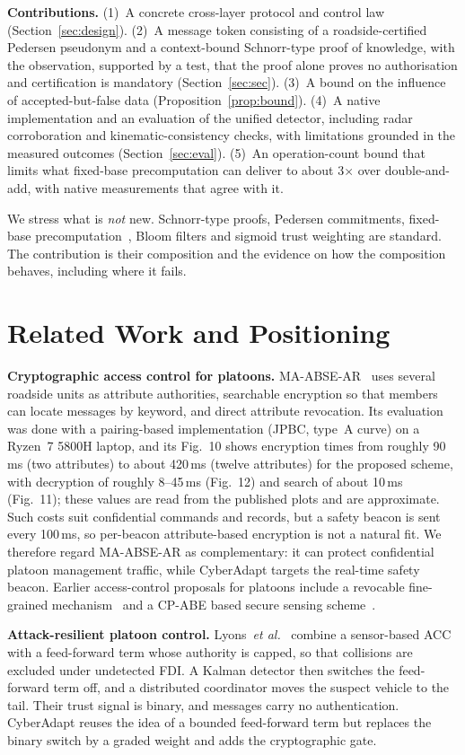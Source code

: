 \documentclass[journal]{IEEEtran}
\begin{document}
\textbf{Contributions.} (1)~A concrete cross-layer protocol and control law (Section~\ref{sec:design}). (2)~A message token consisting of a roadside-certified Pedersen pseudonym and a context-bound Schnorr-type proof of knowledge, with the observation, supported by a test, that the proof alone proves no authorisation and certification is mandatory (Section~\ref{sec:sec}). (3)~A bound on the influence of accepted-but-false data (Proposition~\ref{prop:bound}). (4)~A native implementation and an evaluation of the unified detector, including radar corroboration and kinematic-consistency checks, with limitations grounded in the measured outcomes (Section~\ref{sec:eval}). (5)~An operation-count bound that limits what fixed-base precomputation can deliver to about 3$\times$ over double-and-add, with native measurements that agree with it.

We stress what is \emph{not} new. Schnorr-type proofs, Pedersen commitments, fixed-base precomputation~\cite{bgmw1992}, Bloom filters and sigmoid trust weighting are standard. The contribution is their composition and the evidence on how the composition behaves, including where it fails.

\section{Related Work and Positioning}
\textbf{Cryptographic access control for platoons.} MA-ABSE-AR~\cite{chen2026} uses several roadside units as attribute authorities, searchable encryption so that members can locate messages by keyword, and direct attribute revocation. Its evaluation was done with a pairing-based implementation (JPBC, type~A curve) on a Ryzen~7 5800H laptop, and its Fig.~10 shows encryption times from roughly 90\,ms (two attributes) to about 420\,ms (twelve attributes) for the proposed scheme, with decryption of roughly 8--45\,ms (Fig.~12) and search of about 10\,ms (Fig.~11); these values are read from the published plots and are approximate. Such costs suit confidential commands and records, but a safety beacon is sent every 100\,ms, so per-beacon attribute-based encryption is not a natural fit. We therefore regard MA-ABSE-AR as complementary: it can protect confidential platoon management traffic, while CyberAdapt targets the real-time safety beacon. Earlier access-control proposals for platoons include a revocable fine-grained mechanism~\cite{zhao2022} and a CP-ABE based secure sensing scheme~\cite{jiang2019}.

\textbf{Attack-resilient platoon control.} Lyons~\emph{et al.}~\cite{lyons2026} combine a sensor-based ACC with a feed-forward term whose authority is capped, so that collisions are excluded under undetected FDI. A Kalman detector then switches the feed-forward term off, and a distributed coordinator moves the suspect vehicle to the tail. Their trust signal is binary, and messages carry no authentication. CyberAdapt reuses the idea of a bounded feed-forward term but replaces the binary switch by a graded weight and adds the cryptographic gate.
\end{document}
